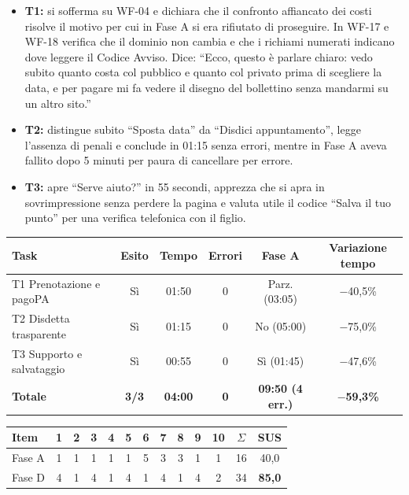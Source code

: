 \begin{itemize}
\item \textbf{T1:} si sofferma su WF-04 e dichiara che il confronto affiancato dei costi risolve il motivo per cui in Fase A si era rifiutato di proseguire. In WF-17 e WF-18 verifica che il dominio non cambia e che i richiami numerati indicano dove leggere il Codice Avviso. Dice: \enquote{Ecco, questo è parlare chiaro: vedo subito quanto costa col pubblico e quanto col privato prima di scegliere la data, e per pagare mi fa vedere il disegno del bollettino senza mandarmi su un altro sito.}
\item \textbf{T2:} distingue subito ``Sposta data'' da ``Disdici appuntamento'', legge l'assenza di penali e conclude in 01:15 senza errori, mentre in Fase A aveva fallito dopo 5 minuti per paura di cancellare per errore.
\item \textbf{T3:} apre ``Serve aiuto?'' in 55 secondi, apprezza che si apra in sovrimpressione senza perdere la pagina e valuta utile il codice ``Salva il tuo punto'' per una verifica telefonica con il figlio.
\end{itemize}

\begin{center}
\label{tab:d-test-giorgio}
\footnotesize
\begin{tabularx}{\linewidth}{@{}>{\raggedright\arraybackslash}X c c c c c@{}}
\toprule
\textbf{Task} & \textbf{Esito} & \textbf{Tempo} & \textbf{Errori} & \textbf{Fase A} & \textbf{Variazione tempo} \\
\midrule
T1 Prenotazione e pagoPA & Sì & 01:50 & 0 & Parz. (03:05) & $-$40,5\% \\
T2 Disdetta trasparente & Sì & 01:15 & 0 & No (05:00) & $-$75,0\% \\
T3 Supporto e salvataggio & Sì & 00:55 & 0 & Sì (01:45) & $-$47,6\% \\
\midrule
\textbf{Totale} & \textbf{3/3} & \textbf{04:00} & \textbf{0} & \textbf{09:50 (4 err.)} & \textbf{$-$59,3\%} \\
\bottomrule
\end{tabularx}
\end{center}

\begin{center}
\label{tab:d-sus-giorgio}
\footnotesize
\setlength{\tabcolsep}{3.5pt}
\begin{tabular}{@{}l *{10}{c} c c@{}}
\toprule
\textbf{Item} & \textbf{1} & \textbf{2} & \textbf{3} & \textbf{4} & \textbf{5} & \textbf{6} & \textbf{7} & \textbf{8} & \textbf{9} & \textbf{10} & $\Sigma$ & \textbf{SUS} \\
\midrule
Fase A & 1 & 1 & 1 & 1 & 1 & 5 & 3 & 3 & 1 & 1 & 16 & 40,0 \\
Fase D & 4 & 1 & 4 & 1 & 4 & 1 & 4 & 1 & 4 & 2 & 34 & \textbf{85,0} \\
\bottomrule
\end{tabular}
\end{center}

